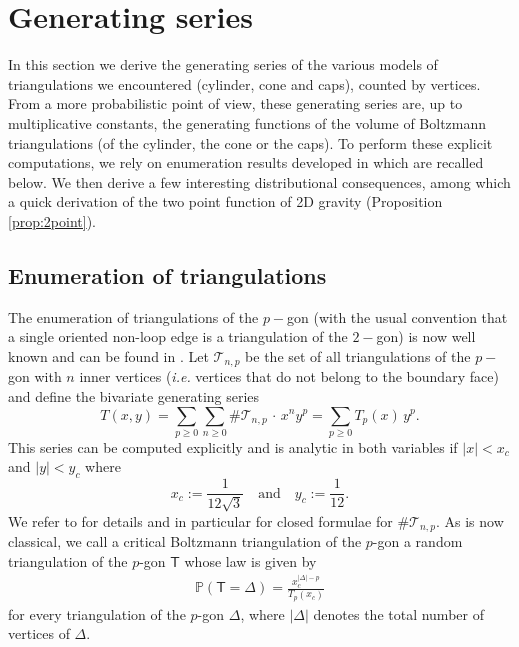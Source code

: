 \documentclass[AHL,XML,longabstracts,Unicode,NoSaveZebib]{cedram}
\begin{document}
\section{Generating series} \label{sec:gs}
In this section we derive the generating series of the various models of triangulations we encountered (cylinder, cone and caps), counted by vertices. From a more probabilistic point of view, these generating series are, up to multiplicative constants, the generating functions of the volume of Boltzmann triangulations (of the cylinder, the cone or the caps).  To perform these explicit computations, we rely on enumeration results developed in \cite{M} which are recalled below. We then derive a few interesting distributional consequences, among which a quick derivation of the two point function of 2D gravity (Proposition \ref{prop:2point}).



\subsection{Enumeration of triangulations} \label{sec:combi}
The enumeration of triangulations of the $p-$gon (with the usual convention that a single oriented non-loop edge is a triangulation of the $2-$gon) is now well known and can be found  in \cite{GouldenJackson}. Let $\mathcal{T}_{n,p}$ be the set of all triangulations of the $p-$gon with $n$ inner vertices (\emph{i.e.} vertices that do not belong to the boundary face) and define the bivariate generating series
\begin{equation}
\label{eq:Tseries}
T(x,y) = \sum_{p \geq 0} \sum_{n \geq 0} \# \mathcal{T}_{n,p} \, \cdot \, x^n y^{p} = \sum_{p \geq 0} T_p(x) \, y^{p}.
\end{equation}
This series can be computed explicitly and is analytic in both variables if $|x| < x_c$ and $|y| < y_c$ where
\begin{equation}
\label{eq:radii}
x_c := \frac{1}{12 \sqrt{3}}
\quad \text{and} \quad
y_c := \frac{1}{12}.
\end{equation}
We refer to \cite{Kr} for details and in particular for closed formulae for  $\# \mathcal{T}_{n,p}$. As is now classical, we call a critical Boltzmann triangulation of the $p$-gon a random triangulation of the $p$-gon $\mathsf T$ whose law is given by
\begin{align} \label{eq:Boltz}
\mathbb P \left( \mathsf T = \Delta \right) = \frac{x_c^{|\Delta|-p}}{T_p(x_c)}
\end{align}
for every triangulation of the $p$-gon $\Delta$, where $|\Delta|$ denotes the total number of vertices of $\Delta$.
\end{document}
